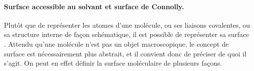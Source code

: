%		
	
	
	\paragraph{Surface accessible au solvant et surface de Connolly.} Plutôt que de représenter les atomes d'une molécule, ou ses liaisons covalentes, ou sa structure interne de façon schématique, il est possible de représenter sa \og surface \fg{}. Attendu qu'une molécule n'est pas un objet macroscopique, le concept de surface est nécessairement plus abstrait, et il convient donc de préciser de quoi il s'agit. On peut en effet définir la surface moléculaire de plusieurs façons.
		
